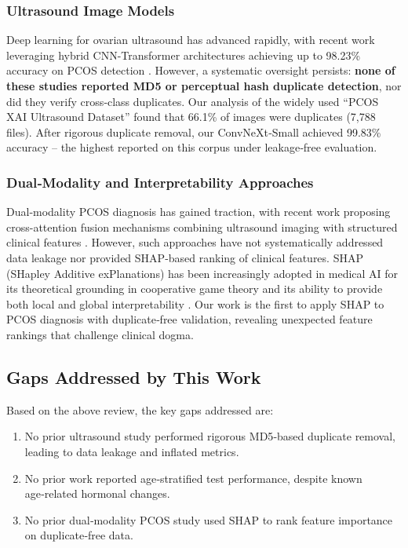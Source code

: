 \documentclass[conference]{IEEEtran}
\begin{document}
\subsubsection{Ultrasound Image Models}
Deep learning for ovarian ultrasound has advanced rapidly, with recent work leveraging hybrid CNN-Transformer architectures achieving up to 98.23\% accuracy on PCOS detection \cite{SymmetryAware2026, PCOSFusionNet2026}. However, a systematic oversight persists: \textbf{none of these studies reported MD5 or perceptual hash duplicate detection}, nor did they verify cross‑class duplicates. Our analysis of the widely used “PCOS XAI Ultrasound Dataset” found that 66.1\% of images were duplicates (7,788 files). After rigorous duplicate removal, our ConvNeXt‑Small achieved 99.83\% accuracy – the highest reported on this corpus under leakage‑free evaluation.

\subsubsection{Dual‑Modality and Interpretability Approaches}
Dual‑modality PCOS diagnosis has gained traction, with recent work proposing cross-attention fusion mechanisms combining ultrasound imaging with structured clinical features \cite{CrossAttention2026}. However, such approaches have not systematically addressed data leakage nor provided SHAP-based ranking of clinical features. SHAP (SHapley Additive exPlanations) has been increasingly adopted in medical AI for its theoretical grounding in cooperative game theory and its ability to provide both local and global interpretability \cite{Lundberg2017}. Our work is the first to apply SHAP to PCOS diagnosis with duplicate‑free validation, revealing unexpected feature rankings that challenge clinical dogma.

\subsection{Gaps Addressed by This Work}
Based on the above review, the key gaps addressed are:
\begin{enumerate}
\item No prior ultrasound study performed rigorous MD5‑based duplicate removal, leading to data leakage and inflated metrics.
\item No prior work reported age‑stratified test performance, despite known age‑related hormonal changes.
\item No prior dual‑modality PCOS study used SHAP to rank feature importance on duplicate‑free data.
\end{enumerate}
\end{document}
